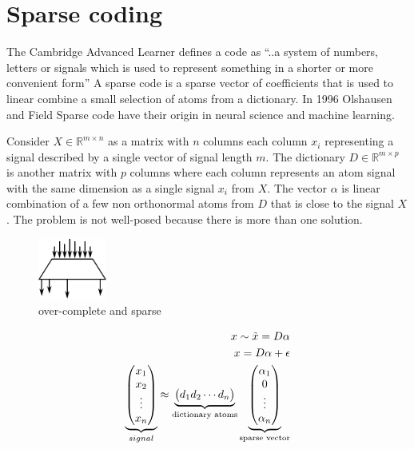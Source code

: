\chapter{Sparse coding}
\label{chap:sparse_coding}

The Cambridge Advanced Learner defines a code as ``..a system of numbers,
letters or signals which is used to represent something in a shorter or more
convenient form'' A sparse code is a sparse vector of coefficients that is used
to linear combine a small selection of atoms from a dictionary. In 
1996 Olshausen and Field\cite{Olshausen1996} Sparse code have
their origin in neural science and machine learning.


Consider $X \in \mathbb{R}^{m\times n}$  as a matrix with $n$ columns each
column $x_{i}$ representing a signal described by a single vector of
signal length $m$. The dictionary $D\in\mathbb{R}^{m \times p}$ is another
matrix with $p$ columns where each column represents an atom signal with the
same dimension as a single signal $x_{i}$ from $X$. The vector $\alpha$ is
linear combination of a few non orthonormal atoms from $D$ that is close to the
signal $X$. The problem is not well-posed because there is more than one
solution. 

\begin{figure}[h]
\centering
\includegraphics[width = 0.20\textwidth]{images/sparse.pdf}
\caption{over-complete and sparse}
\label{fig:sparse}
\end{figure}


\begin{align}
x \sim \tilde{x} = D\alpha \notag\\
x = D\alpha+\epsilon \notag\\
\underbrace{\begin{pmatrix} x_1 \\ x_2 \\ \vdots \\ x_n \end{pmatrix}}_{signal} \approx \underbrace{\begin{pmatrix} d_1  d_2 \cdots d_n \end{pmatrix}}_{\textrm{dictionary atoms}}
\underbrace{\begin{pmatrix} \alpha_1 \\ 0 \\ \vdots \\ \alpha_n \end{pmatrix}}_{\textrm{sparse vector}}
\end{align}


